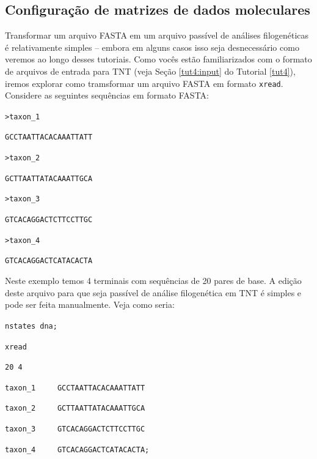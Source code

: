 \begin{refsection}
\section{Configuração de matrizes de dados moleculares}\label{tut7:matrices}

Transformar um arquivo FASTA em um arquivo passível de análises filogenéticas é relativamente simples -- embora em alguns casos isso seja desnecessário como veremos ao longo desses tutoriais. Como vocês estão familiarizados com o formato de arquivos de entrada para TNT (veja Seção \ref{tut4:input} do Tutorial \ref{tut4}), iremos explorar como tramsformar um arquivo FASTA em formato \texttt{xread}.\\

	Considere as seguintes sequências em formato FASTA:\\

\scriptsize

\noindent\texttt{>taxon\_1}

\noindent\texttt{GCCTAATTACACAAATTATT}

\noindent\texttt{>taxon\_2}

\noindent\texttt{GCTTAATTATACAAATTGCA}

\noindent\texttt{>taxon\_3}

\noindent\texttt{GTCACAGGACTCTTCCTTGC}

\noindent\texttt{>taxon\_4}

\noindent\texttt{GTCACAGGACTCATACACTA}


\normalsize

\vspace{0.5cm}

Neste exemplo temos 4 terminais com sequências de 20 pares de base. A edição deste arquivo para que seja passível de análise filogenética em TNT é simples e pode ser feita manualmente. Veja como seria:\\


\scriptsize

\noindent\texttt{nstates dna;}

\noindent\texttt{xread}

\noindent\texttt{20 4}


\noindent\texttt{taxon\_1~~~~~GCCTAATTACACAAATTATT}


\noindent\texttt{taxon\_2~~~~~GCTTAATTATACAAATTGCA}


\noindent\texttt{taxon\_3~~~~~GTCACAGGACTCTTCCTTGC}


\noindent\texttt{taxon\_4~~~~~GTCACAGGACTCATACACTA;}


\end{refsection}
